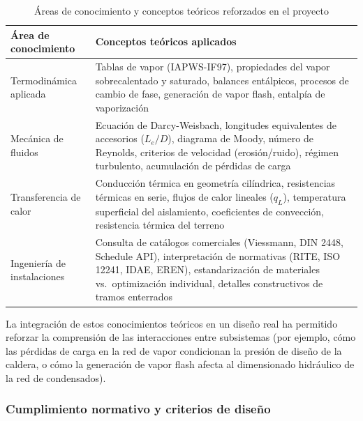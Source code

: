 \begin{table}[H]
	\centering
	\caption{Áreas de conocimiento y conceptos teóricos reforzados en el proyecto}
	\label{tab:conclusiones-conceptos-teoricos}
	\begin{tabular}{p{4cm}p{9cm}}
		\toprule
		\textbf{Área de conocimiento} & \textbf{Conceptos teóricos aplicados}                                                                                                                                                                                                     \\
		\midrule
		Termodinámica aplicada        & Tablas de vapor (IAPWS-IF97), propiedades del vapor sobrecalentado y saturado, balances entálpicos, procesos de cambio de fase, generación de vapor flash, entalpía de vaporización                                                       \\
		\midrule
		Mecánica de fluidos           & Ecuación de Darcy-Weisbach, longitudes equivalentes de accesorios ($L_e/D$), diagrama de Moody, número de Reynolds, criterios de velocidad (erosión/ruido), régimen turbulento, acumulación de pérdidas de carga                          \\
		\midrule
		Transferencia de calor        & Conducción térmica en geometría cilíndrica, resistencias térmicas en serie, flujos de calor lineales ($q_L$), temperatura superficial del aislamiento, coeficientes de convección, resistencia térmica del terreno                        \\
		\midrule
		Ingeniería de instalaciones   & Consulta de catálogos comerciales (Viessmann, DIN 2448, Schedule API), interpretación de normativas (RITE, ISO 12241, IDAE, EREN), estandarización de materiales vs.~optimización individual, detalles constructivos de tramos enterrados \\
		\bottomrule
	\end{tabular}
\end{table}

La integración de estos conocimientos teóricos en un diseño real ha permitido reforzar la comprensión de las interacciones entre subsistemas (por ejemplo, cómo las pérdidas de carga en la red de vapor condicionan la presión de diseño de la caldera, o cómo la generación de vapor flash afecta al dimensionado hidráulico de la red de condensados).

\subsubsection{Cumplimiento normativo y criterios de diseño}
\label{subsubsec:conclusiones-cumplimiento-normativo}

